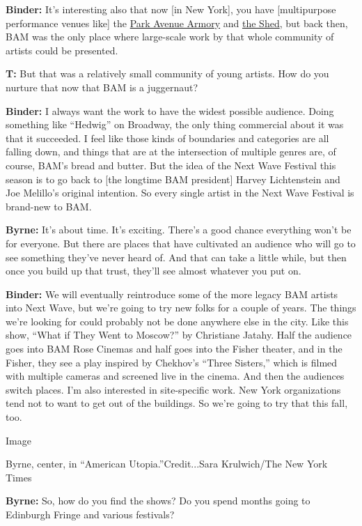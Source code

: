 \textbf{Binder:} It's interesting also that now {[}in New York{]}, you
have {[}multipurpose performance venues like{]} the
\href{http://www.armoryonpark.org/}{Park Avenue Armory} and
\href{https://theshed.org/}{the Shed}, but back then, BAM was the only
place where large-scale work by that whole community of artists could be
presented.

\textbf{T:} But that was a relatively small community of young artists.
How do you nurture that now that BAM is a juggernaut?

\textbf{Binder:} I always want the work to have the widest possible
audience. Doing something like ``Hedwig'' on Broadway, the only thing
commercial about it was that it succeeded. I feel like those kinds of
boundaries and categories are all falling down, and things that are at
the intersection of multiple genres are, of course, BAM's bread and
butter. But the idea of the Next Wave Festival this season is to go back
to {[}the longtime BAM president{]} Harvey Lichtenstein and Joe
Melillo's original intention. So every single artist in the Next Wave
Festival is brand-new to BAM.

\textbf{Byrne:} It's about time. It's exciting. There's a good chance
everything won't be for everyone. But there are places that have
cultivated an audience who will go to see something they've never heard
of. And that can take a little while, but then once you build up that
trust, they'll see almost whatever you put on.

\textbf{Binder:} We will eventually reintroduce some of the more legacy
BAM artists into Next Wave, but we're going to try new folks for a
couple of years. The things we're looking for could probably not be done
anywhere else in the city. Like this show, ``What if They Went to
Moscow?'' by Christiane Jatahy. Half the audience goes into BAM Rose
Cinemas and half goes into the Fisher theater, and in the Fisher, they
see a play inspired by Chekhov's ``Three Sisters,'' which is filmed with
multiple cameras and screened live in the cinema. And then the audiences
switch places. I'm also interested in site-specific work. New York
organizations tend not to want to get out of the buildings. So we're
going to try that this fall, too.

Image

Byrne, center, in ``American Utopia.''Credit...Sara Krulwich/The New
York Times

\textbf{Byrne:} So, how do you find the shows? Do you spend months going
to Edinburgh Fringe and various festivals?

